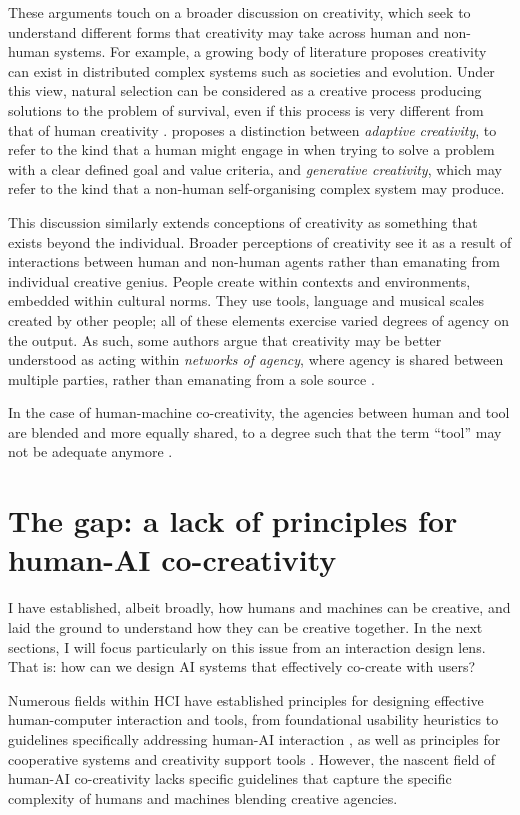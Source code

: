 These arguments touch on a broader discussion on creativity, which seek to understand different forms that creativity may take across human and non-human systems. For example, a growing body of literature proposes creativity can exist in distributed complex systems such as societies and evolution. Under this view, natural selection can be considered as a creative process producing solutions to the problem of survival, even if this process is very different from that of human creativity \citep{Wagner2015-oj}. \citet{Bown2012-gg} proposes a distinction between \textit{adaptive creativity}, to refer to the kind that a human might engage in when trying to solve a problem with a clear defined goal and value criteria, and \textit{generative creativity}, which may refer to the kind that a non-human self-organising complex system may produce. 

This discussion similarly extends conceptions of creativity as something that exists beyond the individual. Broader perceptions of creativity see it as a result of interactions between human and non-human agents rather than emanating from individual creative genius. People create within contexts and environments, embedded within cultural norms. They use tools, language and musical scales created by other people; all of these elements exercise varied degrees of agency on the output. As such, some authors argue that creativity may be better understood as acting within \textit{networks of agency}, where agency is shared between multiple parties, rather than emanating from a sole source \citep{Brown2016-tc, Malafouris2008-xn}. 

In the case of human-machine co-creativity, the agencies between human and tool are blended and more equally shared, to a degree such that the term ``tool'' may not be adequate anymore \citep{Lawton2023-tb}. 

\section{The gap: a lack of principles for human-AI co-creativity}

I have established, albeit broadly, how humans and machines can be creative, and laid the ground to understand how they can be creative together. In the next sections, I will focus particularly on this issue from an interaction design lens. That is: how can we design AI systems that effectively co-create with users?

Numerous fields within HCI have established principles for designing effective human-computer interaction and tools, from foundational usability heuristics \citep{Nielsen1994-df} to guidelines specifically addressing human-AI interaction \citep{Amershi2019-vy, Shneiderman2020-je, Wright2020-nt}, as well as principles for cooperative systems \citep{Bengler2012-jf} and creativity support tools \citep{Resnick2005-fs}. However, the nascent field of human-AI co-creativity lacks specific guidelines that capture the specific complexity of humans and machines blending creative agencies. 

